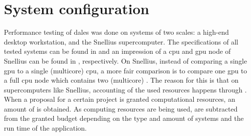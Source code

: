 \section{System configuration} \label{sec:system_configuration}
Performance testing of \acrshort{dales} was done on systems of two scales: a high-end desktop workstation, and the Snellius supercomputer. The specifications of all tested systems can be found in  and an impression of a \acrshort{cpu} and \acrshort{gpu} node of Snellius can be found in , respectively. On Snellius, instead of comparing a single \acrshort{gpu} to a single (multicore) \acrshort{cpu}, a more fair comparison is to compare one \acrshort{gpu} to a full \acrshort{cpu} node which contains two (multicore) . The reason for this is that on supercomputers like Snellius, accounting of the used resources happens through . When a proposal for a certain project is granted computational resources, an amount of  is obtained. As computing resources are being used,  are subtracted from the granted budget depending on the type and amount of systems and the run time of the application.

